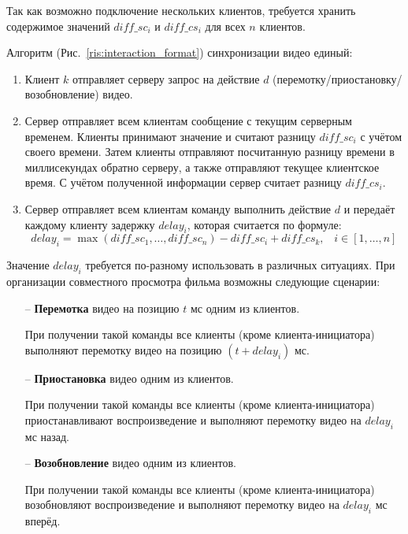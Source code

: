 Так как возможно подключение нескольких клиентов, требуется хранить содержимое значений \(diff\_sc_i\) и \(diff\_cs_i\) для всех \(n\) клиентов.

Алгоритм (Рис.~\ref{ris:interaction_format}) синхронизации видео единый:
\begin{enumerate}
    \item Клиент \(k\) отправляет серверу запрос на действие \(d\) (перемотку/приостановку/возобновление) видео.
    \item Сервер отправляет всем клиентам сообщение с текущим серверным временем.
    Клиенты принимают значение и считают разницу \(diff\_sc_i\) с учётом своего времени.
    Затем клиенты отправляют посчитанную разницу времени в миллисекундах обратно серверу, а также отправляют текущее клиентское время.
    С учётом полученной информации сервер считает разницу \(diff\_cs_i\).
    \item Сервер отправляет всем клиентам команду выполнить действие \(d\) и передаёт каждому клиенту задержку \(delay_i\),
    которая считается по формуле: \[ delay_i = \max(diff\_sc_1, \ldots, diff\_sc_n) - diff\_sc_i + diff\_cs_k, \;\;\; i \in [1, \ldots, n] \]
\end{enumerate}

Значение \(delay_i\) требуется по-разному использовать в различных ситуациях.
При организации совместного просмотра фильма возможны следующие сценарии:
\begin{itemize}
    \item[--] \textbf{Перемотка} видео на позицию \(t\) мс одним из клиентов.

    При получении такой команды все клиенты (кроме клиента-инициатора) выполняют перемотку видео на позицию \((t + delay_i)\) мс.
    \item[--] \textbf{Приостановка} видео одним из клиентов.

    При получении такой команды все клиенты (кроме клиента-инициатора) приостанавливают воспроизведение и выполняют перемотку видео на \(delay_i\) мс назад.
    \item[--] \textbf{Возобновление} видео одним из клиентов.

    При получении такой команды все клиенты (кроме клиента-инициатора) возобновляют воспроизведение и выполняют перемотку видео на \(delay_i\) мс вперёд.
\end{itemize}

